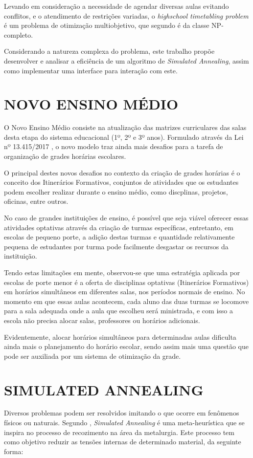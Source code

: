 Levando em consideração a necessidade de agendar diversas aulas evitando conflitos, e o atendimento de restrições variadas, o \textit{highschool timetabling problem} é um problema de otimização multiobjetivo, que segundo  é da classe NP-completo.

Considerando a natureza complexa do problema, este trabalho propõe desenvolver e analisar a eficiência de um algoritmo de \textit{Simulated Annealing}, assim como implementar uma interface para interação com este.

\section{NOVO ENSINO MÉDIO}
\label{sec:novo_ensino_medio}
O Novo Ensino Médio consiste na atualização das matrizes curriculares das salas desta etapa do sistema educacional (1º, 2º e 3º anos). Formulado através da Lei nº 13.415/2017 \cite{lei13415}, o novo modelo traz ainda mais desafios para a tarefa de organização de grades horárias escolares.

O principal destes novos desafios no contexto da criação de grades horárias é o conceito dos Itinerários Formativos, conjuntos de atividades que os estudantes podem escolher realizar durante o ensino médio, como discplinas, projetos, oficinas, entre outros.

No caso de grandes instituições de ensino, é possível que seja viável oferecer essas atividades optativas através da criação de turmas específicas, entretanto, em escolas de pequeno porte, a adição destas turmas e quantidade relativamente pequena de estudantes por turma pode facilmente desgastar os recursos da instituição.

Tendo estas limitações em mente, observou-se que uma estratégia aplicada por escolas de porte menor é a oferta de disciplinas optativas (Itinerários Formativos) em horários simultâneos em diferentes salas, nos períodos normais de ensino. No momento em que essas aulas acontecem, cada aluno das duas turmas se locomove para a sala adequada onde a aula que escolheu será ministrada, e com isso a escola não precisa alocar salas, professores ou horários adicionais. 

Evidentemente, alocar horários simultâneos para determinadas aulas dificulta ainda mais o planejamento do horário escolar, sendo assim mais uma questão que pode ser auxiliada por um sistema de otimização da grade.

\section{SIMULATED ANNEALING}
Diversos problemas podem ser resolvidos imitando o que ocorre em fenômenos físicos ou naturais. Segundo , \textit{Simulated Annealing} é uma meta-heurística que se inspira no processo de recozimento na área da metalurgia. Este processo tem como objetivo reduzir as tensões internas de determinado material, da seguinte forma:

